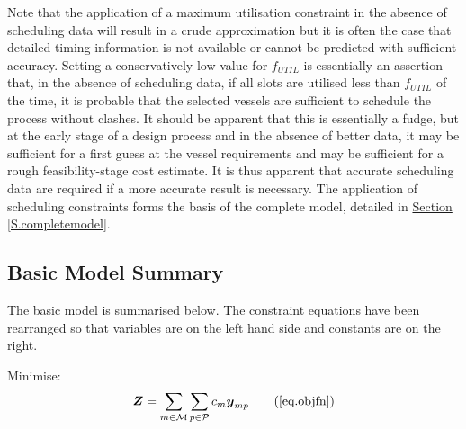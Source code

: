 Note that the application of a maximum utilisation constraint in the absence of
scheduling data will result in a crude approximation but it is often the case
that detailed timing information is not available or cannot be predicted with
sufficient accuracy.
Setting a conservatively low value for $f_{\mathit{UTIL}}$ is essentially an
assertion that, in the absence of scheduling data, if all slots are utilised
less than $f_{\mathit{UTIL}}$ of the time, it is probable that the selected
vessels are sufficient to schedule the process without clashes.
It should be apparent that this is essentially a fudge, but at the early stage
of a design process and in the absence of better data, it may be sufficient for
a first guess at the vessel requirements and may be sufficient for a rough
feasibility-stage cost estimate.
It is thus apparent that accurate scheduling data are required if a more
accurate result is necessary.  The application of scheduling constraints forms
the basis of the complete model, detailed in
\hyperref[S.completemodel]{Section \ref*{S.completemodel}}.

\subsection{Basic Model Summary}\label{SS.basicsummary}

The basic model is summarised below.
The constraint equations have been rearranged so that variables are on the left
hand side and constants are on the right.

Minimise:
\begin{equation}
    \boldsymbol{Z} = \sum_{m \in \mathcal{M}} \sum_{p \in \mathcal{P}} c_m
    \boldsymbol{y}_{mp}
    \tag{\ref{eq.objfn}}
\end{equation}

